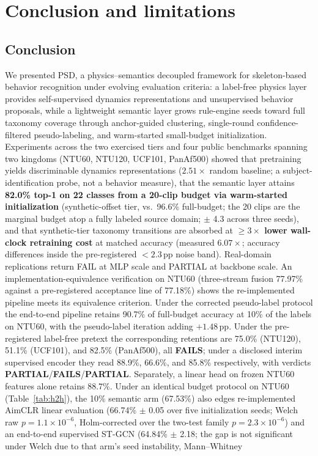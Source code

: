 \section{Conclusion and limitations}\label{sec:conclusion}

\subsection{Conclusion}

We presented PSD, a physics--semantics decoupled framework for skeleton-based behavior recognition under evolving evaluation criteria: a label-free physics layer provides self-supervised dynamics representations and unsupervised behavior proposals, while a lightweight semantic layer grows rule-engine seeds toward full taxonomy coverage through anchor-guided clustering, single-round confidence-filtered pseudo-labeling, and warm-started small-budget initialization. Experiments across the two exercised tiers and four public benchmarks spanning two kingdoms (NTU60, NTU120, UCF101, PanAf500) showed that pretraining yields discriminable dynamics representations ($2.51\times$ random baseline; a subject-identification probe, not a behavior measure), that the semantic layer attains \textbf{82.0\% top-1 on 22 classes from a 20-clip budget via warm-started initialization} (synthetic-offset tier, vs.\ 96.6\% full-budget; the 20 clips are the marginal budget atop a fully labeled source domain; $\pm$ 4.3 across three seeds), and that synthetic-tier taxonomy transitions are absorbed at \textbf{$\geq 3\times$ lower wall-clock retraining cost} at matched accuracy (measured $6.07\times$; accuracy differences inside the pre-registered $<2.3$\,pp noise band). Real-domain replications return FAIL at MLP scale and PARTIAL at backbone scale. An implementation-equivalence verification on NTU60 (three-stream fusion 77.97\% against a pre-registered acceptance line of 77.18\%) shows the re-implemented pipeline meets its equivalence criterion. Under the corrected pseudo-label protocol the end-to-end pipeline retains 90.7\% of full-budget accuracy at 10\% of the labels on NTU60, with the pseudo-label iteration adding $+1.48$\,pp. Under the pre-registered label-free pretext the corresponding retentions are 75.0\% (NTU120), 51.1\% (UCF101), and 82.5\% (PanAf500), all \textbf{FAILS}; under a disclosed interim supervised encoder they read 88.9\%, 66.6\%, and 85.8\% respectively, with verdicts \textbf{PARTIAL}/\textbf{FAILS}/\textbf{PARTIAL}. Separately, a linear head on frozen NTU60 features alone retains 88.7\%. Under an identical budget protocol on NTU60 (Table~\ref{tab:h2h}), the 10\% semantic arm (67.53\%) also edges re-implemented AimCLR linear evaluation (66.74\% $\pm$ 0.05 over five initialization seeds; Welch raw $p{=}1.1\times10^{-6}$, Holm-corrected over the two-test family $p{=}2.3\times10^{-6}$) and an end-to-end supervised ST-GCN (64.84\% $\pm$ 2.18; the gap is not significant under Welch due to that arm's seed instability, Mann--Whitney 
